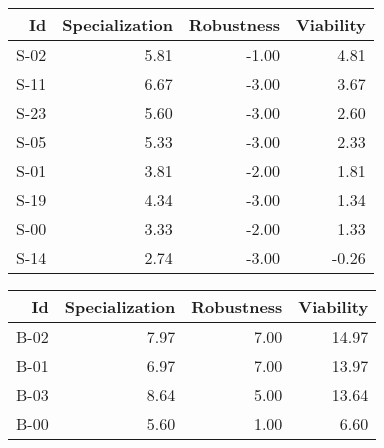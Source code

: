 


\begin{tabular}{ | r | r | r | r | }
    \hline
                    Id  &  Specialization  &      Robustness  &       Viability  \\
    \hline
    \hline
                  S-02  &            5.81  &           -1.00  &            4.81  \\
    \hline
                  S-11  &            6.67  &           -3.00  &            3.67  \\
    \hline
                  S-23  &            5.60  &           -3.00  &            2.60  \\
    \hline
                  S-05  &            5.33  &           -3.00  &            2.33  \\
    \hline
                  S-01  &            3.81  &           -2.00  &            1.81  \\
    \hline
                  S-19  &            4.34  &           -3.00  &            1.34  \\
    \hline
                  S-00  &            3.33  &           -2.00  &            1.33  \\
    \hline
                  S-14  &            2.74  &           -3.00  &           -0.26  \\
    \hline
\end{tabular}


\begin{tabular}{ | r | r | r | r | }
    \hline
                    Id  &  Specialization  &      Robustness  &       Viability  \\
    \hline
    \hline
                  B-02  &            7.97  &            7.00  &           14.97  \\
    \hline
                  B-01  &            6.97  &            7.00  &           13.97  \\
    \hline
                  B-03  &            8.64  &            5.00  &           13.64  \\
    \hline
                  B-00  &            5.60  &            1.00  &            6.60  \\
    \hline
\end{tabular}


